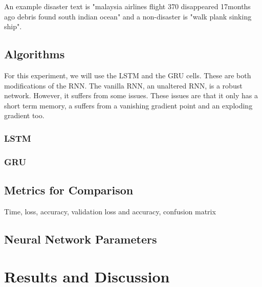 \documentclass[a4paper,10pt]{article}
\begin{document}
	An example disaster text is "malaysia airlines flight 370 disappeared 17months ago debris found south indian ocean" and a non-disaster is "walk plank sinking ship".

\subsection{Algorithms}
	For this experiment, we will use the LSTM and the GRU cells. These are both modifications of the RNN. The vanilla RNN, an unaltered RNN, is a robust network. However, it suffers from some issues. These issues are that it only has a short term memory, a suffers from a vanishing gradient point and an exploding gradient too.
	
	\subsubsection{LSTM}
	\subsubsection{GRU}

\subsection{Metrics for Comparison}
Time, loss, accuracy, validation loss and accuracy, confusion matrix

\subsection{Neural Network Parameters}


\section{Results and Discussion}


\medskip
\newpage
	
	




\end{document}
